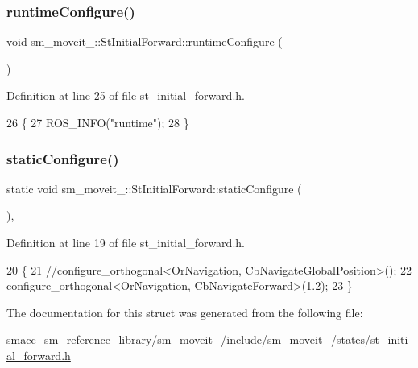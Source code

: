 \subsubsection{\texorpdfstring{runtime\+Configure()}{runtimeConfigure()}}
{\footnotesize\ttfamily void sm\+\_\+moveit\+\_\+::\+St\+Initial\+Forward\+::runtime\+Configure (\begin{DoxyParamCaption}{ }\end{DoxyParamCaption})\hspace{0.3cm}{\ttfamily [inline]}}



Definition at line 25 of file st\+\_\+initial\+\_\+forward.\+h.


\begin{DoxyCode}
26     \{
27         ROS\_INFO(\textcolor{stringliteral}{"runtime"});
28     \}
\end{DoxyCode}
\mbox{\label{structsm__moveit__3_1_1StInitialForward_a03cbacf9d197afda8e868c38b85519bf}} 
\subsubsection{\texorpdfstring{static\+Configure()}{staticConfigure()}}
{\footnotesize\ttfamily static void sm\+\_\+moveit\+\_\+::\+St\+Initial\+Forward\+::static\+Configure (\begin{DoxyParamCaption}{ }\end{DoxyParamCaption})\hspace{0.3cm}{\ttfamily [inline]}, {\ttfamily [static]}}



Definition at line 19 of file st\+\_\+initial\+\_\+forward.\+h.


\begin{DoxyCode}
20     \{
21         \textcolor{comment}{//configure\_orthogonal<OrNavigation, CbNavigateGlobalPosition>();}
22         configure\_orthogonal<OrNavigation, CbNavigateForward>(1.2);
23     \}
\end{DoxyCode}


The documentation for this struct was generated from the following file\+:\begin{DoxyCompactItemize}
\item 
smacc\+\_\+sm\+\_\+reference\+\_\+library/sm\+\_\+moveit\+\_/include/sm\+\_\+moveit\+\_/states/\hyperlink{3_2include_2sm__moveit__3_2states_2st__initial__forward_8h}{st\+\_\+initial\+\_\+forward.\+h}\end{DoxyCompactItemize}
